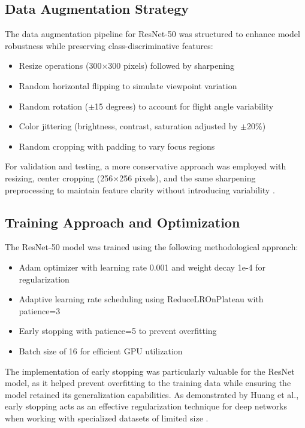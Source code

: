 \subsection{Data Augmentation Strategy}

The data augmentation pipeline for ResNet-50 was structured to enhance model robustness while preserving class-discriminative features:

\begin{itemize}
    \item Resize operations (300$\times$300 pixels) followed by sharpening
    \item Random horizontal flipping to simulate viewpoint variation
    \item Random rotation ($\pm$15 degrees) to account for flight angle variability
    \item Color jittering (brightness, contrast, saturation adjusted by $\pm$20\%)
    \item Random cropping with padding to vary focus regions
\end{itemize}

For validation and testing, a more conservative approach was employed with resizing, center cropping (256$\times$256 pixels), and the same sharpening preprocessing to maintain feature clarity without introducing variability \citep{shorten2019survey}.

\subsection{Training Approach and Optimization}

The ResNet-50 model was trained using the following methodological approach:

\begin{itemize}
    \item Adam optimizer with learning rate 0.001 and weight decay 1e-4 for regularization
    \item Adaptive learning rate scheduling using ReduceLROnPlateau with patience=3
    \item Early stopping with patience=5 to prevent overfitting
    \item Batch size of 16 for efficient GPU utilization
\end{itemize}

The implementation of early stopping was particularly valuable for the ResNet model, as it helped prevent overfitting to the training data while ensuring the model retained its generalization capabilities. As demonstrated by Huang et al., early stopping acts as an effective regularization technique for deep networks when working with specialized datasets of limited size \citep{huang2022early}.
